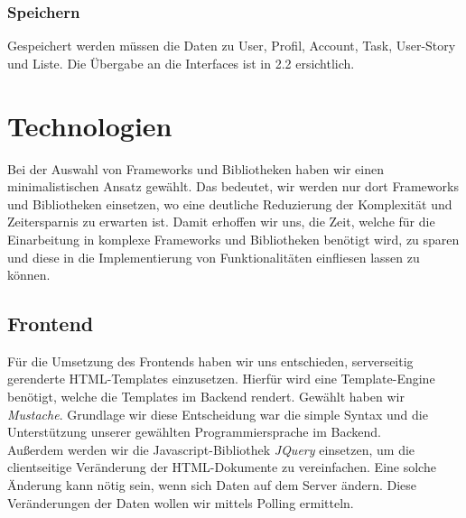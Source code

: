 \documentclass{article}
\begin{document}
\subsubsection{Speichern}
Gespeichert werden müssen die Daten zu User, Profil, Account, Task, User-Story und Liste. Die Übergabe an die Interfaces ist in 2.2 ersichtlich.



\section{Technologien}
Bei der Auswahl von Frameworks und Bibliotheken haben wir einen minimalistischen Ansatz gewählt.
Das bedeutet, wir werden nur dort Frameworks und Bibliotheken einsetzen, wo eine deutliche Reduzierung der Komplexität und Zeitersparnis zu erwarten ist.
Damit erhoffen wir uns, die Zeit, welche für die Einarbeitung in komplexe Frameworks und Bibliotheken benötigt wird, zu sparen und diese in die Implementierung von Funktionalitäten einfliesen lassen zu können.

\subsection{Frontend}
Für die Umsetzung des Frontends haben wir uns entschieden, serverseitig gerenderte HTML-Templates einzusetzen.
Hierfür wird eine Template-Engine benötigt, welche die Templates im Backend rendert.
Gewählt haben wir \textit{Mustache}.
Grundlage wir diese Entscheidung war die simple Syntax und die Unterstützung unserer gewählten Programmiersprache im Backend.\\
Außerdem werden wir die Javascript-Bibliothek \textit{JQuery} einsetzen, um die clientseitige Veränderung der HTML-Dokumente zu vereinfachen.
Eine solche Änderung kann nötig sein, wenn sich Daten auf dem Server ändern.
Diese Veränderungen der Daten wollen wir mittels Polling ermitteln.
\end{document}
